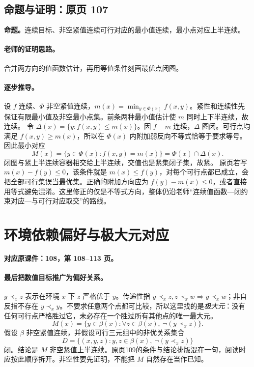 \documentclass[11pt,a4paper]{article}
\theoremstyle{definition}\newtheorem{definition}{定义}\newtheorem{example}{例}
\begin{document}
\subsection{命题与证明：原页 107}

\textbf{命题。}连续目标、非空紧值连续可行对应的最小值连续，最小点对应上半连续。

\paragraph{老师的证明思路。}合并两方向的值函数估计，再用等值条件刻画最优点闭图。

\paragraph{逐步推导。}
设 $f$ 连续、$\Phi$ 非空紧值连续，$m(x)=\min_{y\in\Phi(x)}f(x,y)$。紧性和连续性先保证有限最小值及非空最小点集。前条两种最小值估计使 $m$ 同时上下半连续，故连续。
令 $\Delta(x)=\{y:f(x,y)\le m(x)\}$。因 $f-m$ 连续，$\Delta$ 图闭。可行点均满足 $f(x,y)\ge m(x)$，所以在 $\Phi(x)$ 内附加弱反向不等式恰等于要求等号。因此最小对应
\[M(x)=\{y\in\Phi(x):f(x,y)=m(x)\}=\Phi(x)\cap\Delta(x).\]
闭图与紧上半连续容器相交给上半连续，交值也是紧集闭子集，故紧。
原页若写 $m(x)-f(y)\le0$，该条件就是 $m(x)\le f(y)$，对每个可行点都已成立，会把全部可行集误当最优集。正确的附加方向应为 $f(y)-m(x)\le0$，或者直接用等式避免混淆。这里修正的仅是不等式方向，整体仍沿老师“连续值函数—闭约束对应—与可行对应取交”的路线。


\clearpage\section{环境依赖偏好与极大元对应}\label{g:108:108}

\textbf{对应原课件：108，第 108--113 页。}


\paragraph{最后把数值目标推广为偏好关系。}
$y\prec_x z$ 表示在环境 $x$ 下 $z$ 严格优于 $y$。传递性指 $y\prec_x z,z\prec_x w\Rightarrow y\prec_x w$；非自反指不存在 $y\prec_x y$。不要求任意两个点都可比较，所以这里找的是\emph{极大元}：没有任何可行点严格胜过它，未必存在一个胜过所有其他点的唯一最大元。
\[M(x)=\{y\in\beta(x):\forall z\in\beta(x),\ \neg(y\prec_x z)\}.
\]
假设 $\beta$ 非空紧值连续，并假设可行三元组中的非优关系集合
\[D=\{(x,y,z):y,z\in\beta(x),\ \neg(y\prec_x z)\}
\]
闭。结论是 $M$ 非空紧值上半连续。原页109的条件与结论排版混在一句，阅读时应按此顺序拆开。非空性要先证明，不能把 $M$ 自然存在当作已知。
\end{document}
